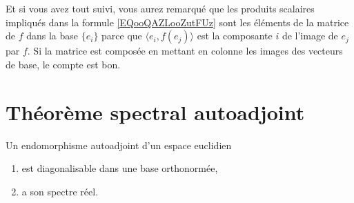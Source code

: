 Et si vous avez tout suivi, vous aurez remarqué que les produits scalaires impliqués dans la formule \eqref{EQooQAZLooZutFUz} sont les éléments de la matrice de \( f\) dans la base \( \{ e_i \}\) parce que \( \langle e_i, f(e_j)\rangle \) est la composante \( i\) de l'image de \( e_j\) par \( f\). Si la matrice est composée en mettant en colonne les images des vecteurs de base, le compte est bon.

\section{Théorème spectral autoadjoint}

\begin{theorem} \label{ThoRSBahHH}
    Un endomorphisme autoadjoint d'un espace euclidien
    \begin{enumerate}
        \item
            est diagonalisable dans une base orthonormée,
        \item
            a son spectre réel.
    \end{enumerate}
\end{theorem}

